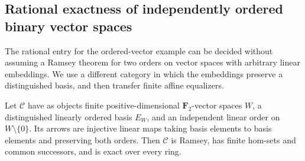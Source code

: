 \subsection{Rational exactness of independently ordered binary vector spaces}

The rational entry for the ordered-vector example can be decided without
assuming a Ramsey theorem for two orders on vector spaces with arbitrary
linear embeddings.  We use a different category in which the embeddings
preserve a distinguished basis, and then transfer finite affine equalizers.

\begin{lemma}
\label{A:ordered-basis-ramsey}
Let $\mathcal C$ have as objects finite positive-dimensional
$\mathbf F_2$-vector spaces $W$, a distinguished linearly ordered basis
$E_W$, and an independent linear order on $W\setminus\{0\}$.
Its arrows are injective linear maps taking basis elements to basis
elements and preserving both orders.  Then $\mathcal C$ is Ramsey,
has finite hom-sets and common successors, and is exact over every ring.
\end{lemma}
